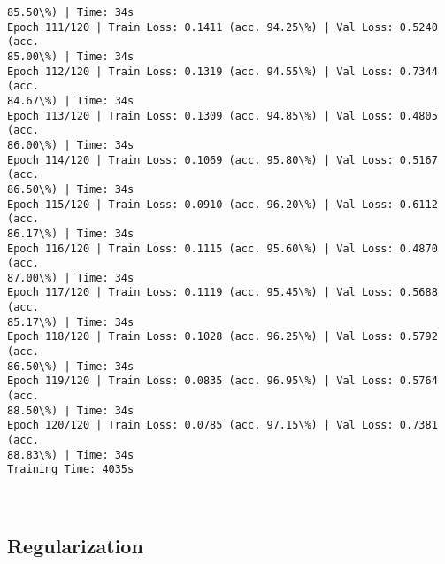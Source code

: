 \documentclass[8pt]{extarticle}
\begin{document}
\begin{Verbatim}[commandchars=\\\{\}]
85.50\%) | Time: 34s
Epoch 111/120 | Train Loss: 0.1411 (acc. 94.25\%) | Val Loss: 0.5240 (acc.
85.00\%) | Time: 34s
Epoch 112/120 | Train Loss: 0.1319 (acc. 94.55\%) | Val Loss: 0.7344 (acc.
84.67\%) | Time: 34s
Epoch 113/120 | Train Loss: 0.1309 (acc. 94.85\%) | Val Loss: 0.4805 (acc.
86.00\%) | Time: 34s
Epoch 114/120 | Train Loss: 0.1069 (acc. 95.80\%) | Val Loss: 0.5167 (acc.
86.50\%) | Time: 34s
Epoch 115/120 | Train Loss: 0.0910 (acc. 96.20\%) | Val Loss: 0.6112 (acc.
86.17\%) | Time: 34s
Epoch 116/120 | Train Loss: 0.1115 (acc. 95.60\%) | Val Loss: 0.4870 (acc.
87.00\%) | Time: 34s
Epoch 117/120 | Train Loss: 0.1119 (acc. 95.45\%) | Val Loss: 0.5688 (acc.
85.17\%) | Time: 34s
Epoch 118/120 | Train Loss: 0.1028 (acc. 96.25\%) | Val Loss: 0.5792 (acc.
86.50\%) | Time: 34s
Epoch 119/120 | Train Loss: 0.0835 (acc. 96.95\%) | Val Loss: 0.5764 (acc.
88.50\%) | Time: 34s
Epoch 120/120 | Train Loss: 0.0785 (acc. 97.15\%) | Val Loss: 0.7381 (acc.
88.83\%) | Time: 34s
Training Time: 4035s
    \end{Verbatim}

    \begin{center}
    \end{center}
    { \hspace*{\fill} \\}
    
    \subsection{Regularization}\label{regularization}
\end{document}
